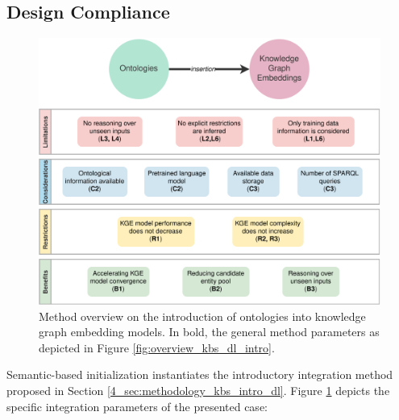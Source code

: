 \subsection{Design Compliance}\label{4_sec:method_assessment}
\begin{figure}[ht]
    \centering
    \includegraphics[width=\linewidth]{4_kbsintegrationdl/figures/Instance_KB_into_DL.eps}
    \caption{Method overview on the introduction of ontologies into knowledge graph embedding models. In bold, the general method parameters as depicted in Figure \ref{fig:overview_kbs_dl_intro}.}
    \label{fig:instance_method_kbs_into_dl}
\end{figure}

Semantic-based initialization instantiates the introductory integration method proposed in Section \ref{4_sec:methodology_kbs_intro_dl}. Figure \ref{fig:instance_method_kbs_into_dl} depicts the specific integration parameters of the presented case:

